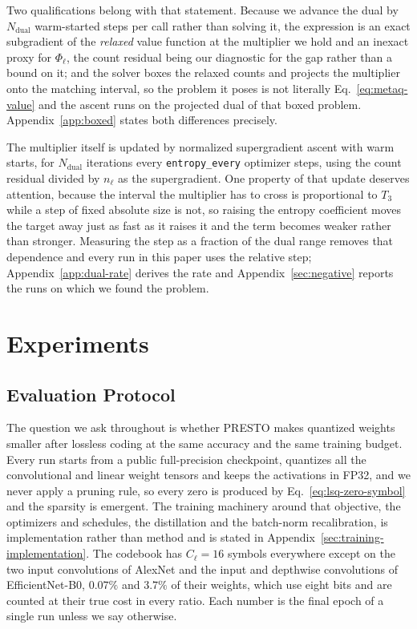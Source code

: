 \documentclass{article}
\begin{document}
Two qualifications belong with that statement. Because we advance the dual by
$N_{\mathrm{dual}}$ warm-started steps per call rather than solving it, the
expression is an exact subgradient of the \emph{relaxed} value function at the
multiplier we hold and an inexact proxy for $\Phi_\ell$, the count residual being
our diagnostic for the gap rather than a bound on it; and the solver boxes the
relaxed counts and projects the multiplier onto the matching interval, so the
problem it poses is not literally Eq.~\eqref{eq:metaq-value} and the ascent runs
on the projected dual of that boxed problem. Appendix~\ref{app:boxed} states both
differences precisely.

The multiplier itself is updated by normalized supergradient ascent with warm
starts, for $N_{\mathrm{dual}}$ iterations every \texttt{entropy\_every}
optimizer steps, using the count residual divided by $n_\ell$ as the
supergradient. One property of that update deserves attention, because the
interval the multiplier has to cross is proportional to $T_3$ while a step of
fixed absolute size is not, so raising the entropy coefficient moves the target
away just as fast as it raises it and the term becomes weaker rather than
stronger. Measuring the step as a fraction of the dual range removes that
dependence and every run in this paper uses the relative step;
Appendix~\ref{app:dual-rate} derives the rate and
Appendix~\ref{sec:negative} reports the runs on which we found the
problem.

\section{Experiments}
\label{sec:experiments}

\subsection{Evaluation Protocol}

The question we ask throughout is whether PRESTO makes quantized weights smaller
after lossless coding at the same accuracy and the same training budget. Every
run starts from a public full-precision checkpoint, quantizes all the
convolutional and linear weight tensors and keeps the activations in FP32, and we
never apply a pruning rule, so every zero is produced by
Eq.~\eqref{eq:lsq-zero-symbol} and the sparsity is emergent. The training
machinery around that objective, the optimizers and schedules, the distillation
and the batch-norm recalibration, is implementation rather than method and is
stated in Appendix~\ref{sec:training-implementation}. The codebook has $C_\ell=16$
symbols everywhere except on the two input convolutions of AlexNet and the input
and depthwise convolutions of EfficientNet-B0, $0.07\%$ and $3.7\%$ of their
weights, which use eight bits and are counted at their true cost in every ratio. Each number is the final
epoch of a single run unless we say otherwise.
\end{document}
